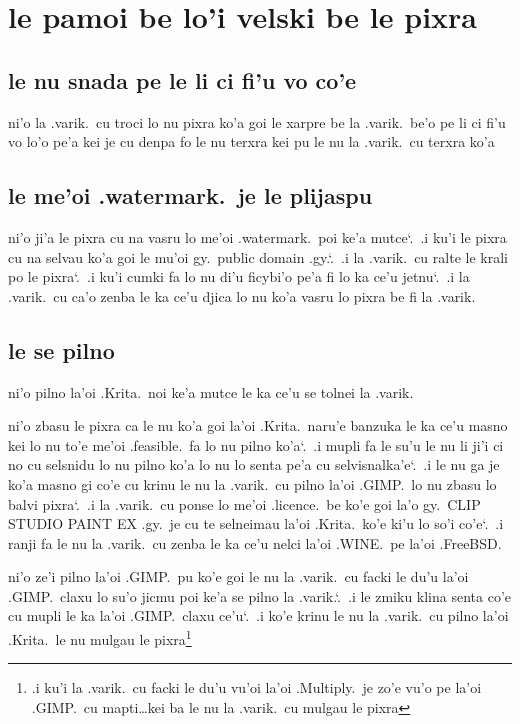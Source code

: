\documentclass{report}
\newcommand\sds{\spacefactor\sfcode`.\ \space}
\begin{document}
\section{le pamoi be lo'i velski be le pixra}
\subsection{le nu snada pe le li ci fi'u vo co'e}
ni'o la .varik.\ cu troci lo nu pixra ko'a goi le xarpre be la .varik.\ be'o pe li ci fi'u vo lo'o pe'a kei je cu denpa fo le nu terxra kei pu le nu la .varik.\ cu terxra ko'a

\subsection{le me'oi .watermark.\ je le plijaspu}
ni'o ji'a le pixra cu na vasru lo me'oi .watermark.\ poi ke'a mutce\sds  .i ku'i le pixra cu na selvau ko'a goi le mu'oi gy.\ public domain .gy.\sds  .i la .varik.\ cu ralte le krali po le pixra\sds  .i ku'i cumki fa lo nu di'u ficybi'o pe'a fi lo ka ce'u jetnu\sds  .i la .varik.\ cu ca'o zenba le ka ce'u djica lo nu ko'a vasru lo pixra be fi la .varik.

\subsection{le se pilno}
ni'o pilno la'oi .Krita.\ noi ke'a mutce le ka ce'u se tolnei la .varik.

ni'o zbasu le pixra ca le nu ko'a goi la'oi .Krita.\ naru'e banzuka le ka ce'u masno kei lo nu to'e me'oi .feasible.\ fa lo nu pilno ko'a\sds  .i mupli fa le su'u le nu li ji'i ci no cu selsnidu lo nu pilno ko'a lo nu lo senta pe'a cu selvisnalka'e\sds  .i le nu ga je ko'a masno gi co'e cu krinu le nu la .varik.\ cu pilno la'oi .GIMP.\ lo nu zbasu lo balvi pixra\sds  .i la .varik.\ cu ponse lo me'oi .licence.\ be ko'e goi la'o gy.\ CLIP STUDIO PAINT EX .gy.\ je cu te selneimau la'oi .Krita.\ ko'e ki'u lo so'i co'e\sds  .i ranji fa le nu la .varik.\ cu zenba le ka ce'u nelci la'oi .WINE.\ pe la'oi .FreeBSD.

ni'o ze'i pilno la'oi .GIMP.\ pu ko'e goi le nu la .varik.\ cu facki le du'u la'oi .GIMP.\ claxu lo su'o jicmu poi ke'a se pilno la .varik.\sds  .i le zmiku klina senta co'e cu mupli le ka la'oi .GIMP.\ claxu ce'u\sds  .i ko'e krinu le nu la .varik.\ cu pilno la'oi .Krita.\ le nu mulgau le pixra\footnote{.i ku'i la .varik.\ cu facki le du'u vu'oi la'oi .Multiply.\ je zo'e vu'o pe la'oi .GIMP.\ cu mapti\ldots kei ba le nu la .varik.\ cu mulgau le pixra}
\end{document}
